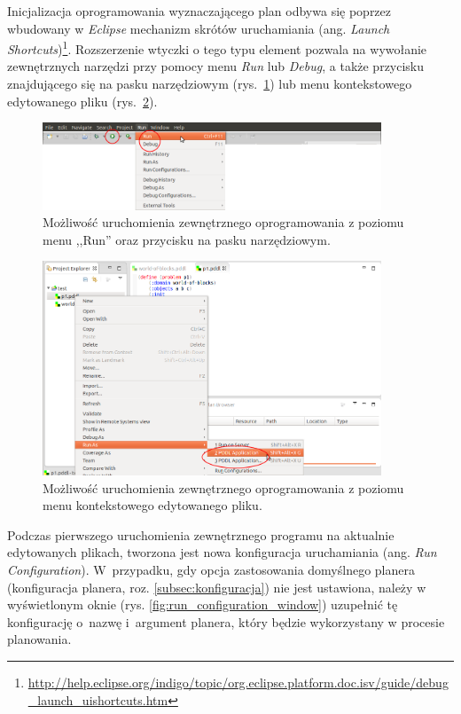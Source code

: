 Inicjalizacja oprogramowania wyznaczającego plan odbywa się poprzez wbudowany w \emph{Eclipse} mechanizm skrótów uruchamiania (ang. \textit{Launch Shortcuts})\footnote{\url{http://help.eclipse.org/indigo/topic/org.eclipse.platform.doc.isv/guide/debug_launch_uishortcuts.htm}}. Rozszerzenie wtyczki o tego typu element pozwala na wywołanie zewnętrznych narzędzi przy pomocy menu \emph{Run} lub \emph{Debug}, a także przycisku znajdującego się na pasku narzędziowym (rys.~\ref{fig:running_options_menu_toolbar}) lub menu kontekstowego edytowanego pliku (rys.~\ref{fig:running_options_context_menu}).
\begin{figure}[h!]
    \centering
    \includegraphics[width=0.9\textwidth]{img/running_options_menu_toolbar}
    \caption{Możliwość uruchomienia zewnętrznego oprogramowania z poziomu menu ,,Run'' oraz przycisku na pasku narzędziowym.}
    \label{fig:running_options_menu_toolbar}
\end{figure}

\begin{figure}[h!]
    \centering
    \includegraphics[width=0.9\textwidth]{img/running_options_context_menu}
    \caption{Możliwość uruchomienia zewnętrznego oprogramowania z poziomu menu kontekstowego edytowanego pliku.}
    \label{fig:running_options_context_menu}
\end{figure}

Podczas pierwszego uruchomienia zewnętrznego programu na aktualnie edytowanych plikach, tworzona jest nowa konfiguracja uruchamiania (ang. \textit{Run Configuration}). W~przypadku, gdy opcja zastosowania domyślnego planera (konfiguracja planera, roz. \ref{subsec:konfiguracja}) nie jest ustawiona, należy w wyświetlonym oknie (rys. \ref{fig:run_configuration_window}) uzupełnić tę konfigurację o~nazwę i~argument planera, który będzie wykorzystany w procesie planowania. 

